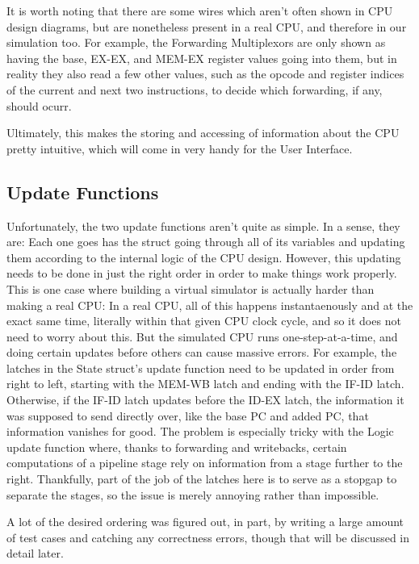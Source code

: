 \documentclass[12pt,twoside]{reedthesis}
\begin{document}
It is worth noting that there are some wires which aren't often shown in CPU design diagrams, but are nonetheless present in a real CPU, and therefore in our simulation too. For example, the Forwarding Multiplexors are only shown as having the base, EX-EX, and MEM-EX register values going into them, but in reality they also read a few other values, such as the opcode and register indices of the current and next two instructions, to decide which forwarding, if any, should ocurr.

Ultimately, this makes the storing and accessing of information about the CPU pretty intuitive, which will come in very handy for the User Interface.

\subsection{Update Functions}

Unfortunately, the two update functions aren't quite as simple. In a sense, they are: Each one goes has the struct going through all of its variables and updating them according to the internal logic of the CPU design. However, this updating needs to be done in just the right order in order to make things work properly. This is one case where building a virtual simulator is actually harder than making a real CPU: In a real CPU, all of this happens instantaenously and at the exact same time, literally within that given CPU clock cycle, and so it does not need to worry about this. But the simulated CPU runs one-step-at-a-time, and doing certain updates before others can cause massive errors. For example, the latches in the State struct's update function need to be updated in order from right to left, starting with the MEM-WB latch and ending with the IF-ID latch. Otherwise, if the IF-ID latch updates before the ID-EX latch, the information it was supposed to send directly over, like the base PC and added PC, that information vanishes for good. The problem is especially tricky with the Logic update function where, thanks to forwarding and writebacks, certain computations of a pipeline stage rely on information from a stage further to the right. Thankfully, part of the job of the latches here is to serve as a stopgap to separate the stages, so the issue is merely annoying rather than impossible.

A lot of the desired ordering was figured out, in part, by writing a large amount of test cases and catching any correctness errors, though that will be discussed in detail later.
\end{document}
